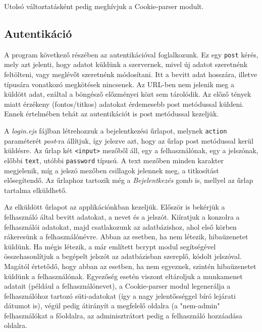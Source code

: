 Utolsó változtatásként pedig meghívjuk a Cookie-parser modult.


\subsection{Autentikáció}

A program következő részében az autentikációval foglalkozunk. Ez egy \texttt{post} kérés, mely azt jelenti, hogy adatot küldünk a szervernek, mivel új adatot szeretnénk feltölteni, vagy meglévőt szeretnénk módosítani. Itt a bevitt adat hosszára, illetve típusára vonatkozó megkötések nincsenek. Az URL-ben nem jelenik meg a küldött adat, ezáltal a böngésző előzményei közt sem tárolódik. Az előző tények miatt érzékeny (fontos/titkos) adatokat érdemesebb post metódussal küldeni. Ennek értelmében tehát az autentikációt is post metódussal kezeljük.

A \textit{login.ejs} fájlban létrehozzuk a bejelentkezési űrlapot, melynek \texttt{action} paraméterét \textit{post}-ra állítjuk, így jelezve azt, hogy az űrlap post metódussal kerül küldésre. Az űrlap két \texttt{<input>} mezőből áll, egy a felhasználónak, egy a jelszónak,  előbbi \texttt{text}, utóbbi \texttt{password} típusú. A text mezőben minden karakter megjelenik, míg a jelszó mezőben csillagok jelennek meg, a titkosítást elősegítendő. Az űrlaphoz tartozik még a \textit{Bejelentkezés} gomb is, mellyel az űrlap tartalma elküldhető.

Az elküldött űrlapot az applikációnkban kezeljük. Először is bekérjük a felhasználó által bevitt adatokat, a nevet és a jelszót. Kiíratjuk a konzolra a felhasználói adatokat, majd csatlakozunk az adatbázishoz, ahol első körben rákeresünk a felhasználónévre. Abban az esetben, ha nem létezik, hibaüzenetet küldünk. Ha mégis létezik, a már említett bcrypt modul segítségével összehasonlítjuk a begépelt jelszót az adatbázisban szereplő, kódolt jelszóval. Magától értetődő, hogy abban az esetben, ha nem egyeznek, szintén hibaüzenetet küldünk a felhasználónak. Egyezőség esetén viszont eltároljuk a munkamenet adatait (például a felhasználónevet), a Cookie-parser modul legenerálja a felhasználóhoz tartozó süti-adatokat (így a nagy jelentősséggel bíró lejárati dátumot is), végül pedig átirányít a megfelelő oldalra (a "nem-admin" felhasználókat a főoldalra, az adminisztrátort pedig a felhasználó hozzáadása oldalra.

